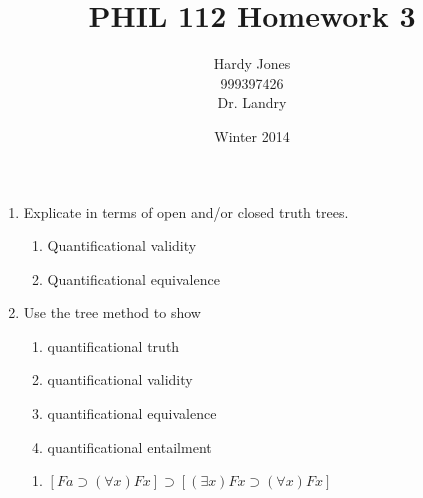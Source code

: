 \documentclass[12pt,letterpaper]{article}
\title{PHIL 112 Homework 3\vspace{-2ex}}
\author{Hardy Jones\\
        999397426\\
        Dr. Landry\vspace{-2ex}}
\date{Winter 2014}
\begin{document}
  \maketitle

  \begin{enumerate}
    \item Explicate in terms of open and/or closed truth trees.
      \begin{enumerate}
        \item Quantificational validity
        \item Quantificational equivalence
      \end{enumerate}
    \item
      Use the tree method to show
      \begin{enumerate}
        \item quantificational truth
        \item quantificational validity
        \item quantificational equivalence
        \item quantificational entailment
      \end{enumerate}
      \begin{enumerate}
        \item
          $[Fa \supset (\forall x)Fx] \supset [(\exists x)Fx \supset (\forall x) Fx]$



\end{enumerate}
\end{enumerate}
\end{document}
